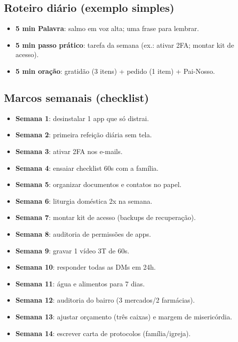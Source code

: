 \subsection*{Roteiro diário (exemplo simples)}
\begin{checklist}
\begin{itemize}[leftmargin=*,noitemsep]
  \item \textbf{5 min Palavra}: salmo em voz alta; uma frase para lembrar.
  \item \textbf{5 min passo prático}: tarefa da semana (ex.: ativar 2FA; montar kit de acesso).
  \item \textbf{5 min oração}: gratidão (3 itens) + pedido (1 item) + Pai-Nosso.
\end{itemize}
\end{checklist}

\subsection*{Marcos semanais (checklist)}
\begin{checklist}
\begin{itemize}[leftmargin=*,noitemsep]
  \item \textbf{Semana 1}: desinstalar 1 app que só distrai.
  \item \textbf{Semana 2}: primeira refeição diária sem tela.
  \item \textbf{Semana 3}: ativar 2FA nos e-mails.
  \item \textbf{Semana 4}: ensaiar checklist 60s com a família.
  \item \textbf{Semana 5}: organizar documentos e contatos no papel.
  \item \textbf{Semana 6}: liturgia doméstica 2x na semana.
  \item \textbf{Semana 7}: montar kit de acesso (backups de recuperação).
  \item \textbf{Semana 8}: auditoria de permissões de apps.
  \item \textbf{Semana 9}: gravar 1 vídeo 3T de 60s.
  \item \textbf{Semana 10}: responder todas as DMs em 24h.
  \item \textbf{Semana 11}: água e alimentos para 7 dias.
  \item \textbf{Semana 12}: auditoria do bairro (3 mercados/2 farmácias).
  \item \textbf{Semana 13}: ajustar orçamento (três caixas) e margem de misericórdia.
  \item \textbf{Semana 14}: escrever carta de protocolos (família/igreja).
\end{itemize}
\end{checklist}

